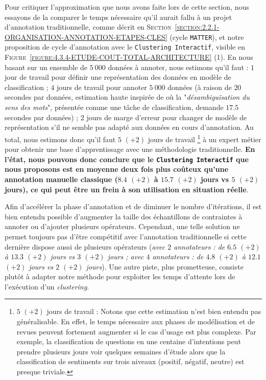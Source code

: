 			Pour critiquer l'approximation que nous avons faite lors de cette section, nous essayons de la comparer le temps nécessaire qu'il aurait fallu à un projet d'annotation traditionnelle, comme décrit en \textsc{Section~\ref{section:2.2.1-ORGANISATION-ANNOTATION-ETAPES-CLES}} (cycle \texttt{MATTER}), et notre proposition de cycle d'annotation avec le \texttt{Clustering Interactif}, visible en \textsc{Figure~\ref{figure:4.3.4-ETUDE-COUT-TOTAL-ARCHITECTURE}} (1).
			En nous basant sur un ensemble de $5~000$ données à annoter, nous estimons qu'il faut :
			$1$ jour de travail pour définir une représentation des données en modèle de classification ;
			$4$ jours de travail pour annoter $5~000$ données (à raison de $20$ secondes par données, estimation haute inspirée de \cite{pradhan-etal:2007:semeval2007-task-17} où la "\textit{désambiguïsation du sens des mots}", présentée comme une tâche de classification, demande $17.5$ secondes par données) ;
			$2$ jours de marge d'erreur pour changer de modèle de représentation s'il ne semble pas adapté aux données en cours d'annotation.
			Au total, nous estimons donc qu'il faut $5$ {\footnotesize $(+2)$} jours de travail \footnote{
				$5$ {\footnotesize $(+2)$} jours de travail : Notons que cette estimation n'est bien entendu pas généralisable.
				En effet, le temps nécessaire aux phases de modélisation et de revues peuvent fortement augmenter si le cas d'usage est plus complexe.
				Par exemple, la classification de questions en une centaine d'intentions peut prendre plusieurs jours voir quelques semaines d'étude alors que la classification de sentiments sur trois niveaux (positif, négatif, neutre) est presque triviale.
			} à un expert métier pour obtenir une base d'apprentissage avec une méthodologie traditionnelle.
			\textbf{En l'état, nous pouvons donc conclure que le \texttt{Clustering Interactif} que nous proposons est en moyenne deux fois plus coûteux qu'une annotation manuelle classique ($8.4$ {\footnotesize $(+2)$} à $15.7$ {\footnotesize $(+2)$} jours vs $5$ {\footnotesize $(+2)$} jours), ce qui peut être un frein à son utilisation en situation réelle}.
			
			Afin d'accélérer la phase d'annotation et de diminuer le nombre d'itérations, il est bien entendu possible d'augmenter la taille des échantillons de contraintes à annoter ou d'ajouter plusieurs opérateurs.
			Cependant, une telle solution ne permet toujours pas d'être compétitif avec l'annotation traditionnelle si cette dernière dispose aussi de plusieurs opérateurs (\textit{avec $2$ annotateurs : de $6.5$ {\footnotesize $(+2)$} à $13.3$ {\footnotesize $(+2)$} jours vs $3$ {\footnotesize $(+2)$} jours ; avec $4$ annotateurs : de $4.8$ {\footnotesize $(+2)$} à $12.1$ {\footnotesize $(+2)$} jours vs $2$ {\footnotesize $(+2)$} jours}).
			Une autre piste, plus prometteuse, consiste plutôt à adapter notre méthode pour exploiter les temps d'attente lors de l'exécution d'un \textit{clustering}.
			

